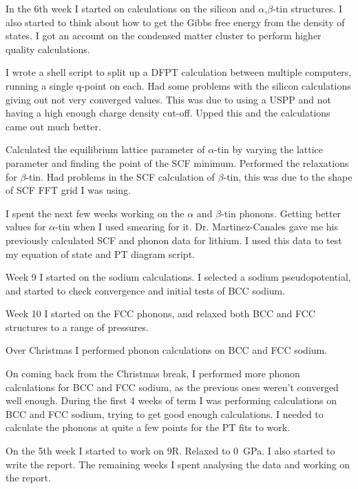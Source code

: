 \documentclass[12pt]{article}
\begin{document}
In the 6th week I started on calculations on the silicon and $\alpha$,$\beta$-tin structures. I also started to think about how to get the Gibbs free energy from the density of states. I got an account on the condensed matter cluster to perform higher quality calculations. 

I wrote a shell script to split up a DFPT calculation between multiple computers, running a single q-point on each. Had some problems with the silicon calculations giving out not very converged values. This was due to using a USPP and not having a high enough charge density cut-off. Upped this and the calculations came out much better.

Calculated the equilibrium lattice parameter of $\alpha$-tin by varying the lattice parameter and finding the point of the SCF minimum. Performed the relaxations for $\beta$-tin. 
Had problems in the SCF calculation of $\beta$-tin, this was due to the shape of SCF FFT grid I was using. 

I spent the next few weeks working on the $\alpha$ and $\beta$-tin phonons. Getting better values for $\alpha$-tin when I used smearing for it.
Dr. Martinez-Canales gave me his previously calculated SCF and phonon data for lithium. I used this data to test my equation of state and PT diagram script.

Week 9 I started on the sodium calculations. I selected a sodium pseudopotential, and started to check convergence and initial tests of BCC sodium. 

Week 10 I started on the FCC phonons, and relaxed both BCC and FCC structures to a range of pressures.

Over Christmas I performed phonon calculations on BCC and FCC sodium.

On coming back from the Christmas break, I performed more phonon calculations for BCC and FCC sodium, as the previous ones weren't converged well enough.
During the first 4 weeks of term I was performing calculations on BCC and FCC sodium, trying to get good enough calculations. 
I needed to calculate the phonons at quite a few points for the PT fits to work.

On the 5th week I started to work on 9R. Relaxed to \SI{0}{\giga\pascal}. I also started to write the report. 
The remaining weeks I spent analysing the data and working on the report.
\acknowledgments
\end{document}
